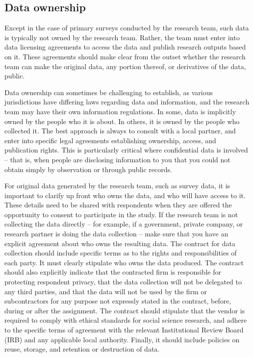 \subsection{Data ownership}
Except in the case of primary surveys conducted by the research team,
such data is typically not owned by the research team.
Rather, the team must enter into data licensing agreements
to access the data and publish research outputs based on it.
These agreements should make clear from the outset whether the
research team can make the original data, any portion thereof, or derivatives
of the data, public.

Data ownership can sometimes be challenging to establish,
as various jurisdictions have differing laws regarding data and information,
and the research team may have their own information regulations.
In some, data is implicitly owned by the people who it is about.
In others, it is owned by the people who collected it.
The best approach is always to consult with a local partner,
and enter into specific legal agreements establishing ownership,
access, and publication rights.
This is particularly critical where confidential data is involved
-- that is, when people are disclosing information to you
that you could not obtain simply by observation or through public records.

For original data generated by the research team, such as survey data,
it is important to clarify up front who owns the data,
and who will have access to it.
These details need to be shared with respondents when they are offered the opportunity
to consent to participate in the study.
If the research team is not collecting the data directly --
for example, if a government, private company, or research partner is doing the data collection --
make sure that you have an explicit agreement
about who owns the resulting data.
The contract for data collection should include specific terms
as to the rights and responsibilities of each party.
It must clearly stipulate who owns the data produced.
The contract should also explicitly indicate that the contracted firm
is responsible for protecting respondent privacy,
that the data collection will not be delegated to any third parties,
and that the data will not be used by the firm or subcontractors for any purpose not expressly stated in the contract,
before, during or after the assignment.
The contract should stipulate that the vendor is required to comply with
ethical standards for social science research,
and adhere to the specific terms of agreement with the relevant
Institutional Review Board (IRB)
and any applicable local authority.
Finally, it should include policies on reuse, storage,
and retention or destruction of data.

